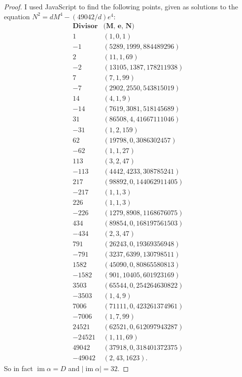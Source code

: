 \documentclass[12pt]{article}
\DeclareMathOperator{\im}{im}
\theoremstyle{definition}
\begin{document}
\begin{proof}
	I used JavaScript to find the following points, given as solutions to the equation $N^2 = dM^4 - (49042/d) e^4$: \begin{equation*}
		\begin{array}{r|c}
			\textbf{Divisor} & \textbf{(M, e, N)}       \\
			\hline
			1                & (1, 0, 1)                \\
			-1               & (5289, 1999, 884489296)  \\
			2                & (11, 1, 69)              \\
			-2               & (13105, 1387, 178211938) \\
			7                & (7, 1, 99)               \\
			-7               & (2902, 2550, 543815019)  \\
			14               & (4, 1, 9)                \\
			-14              & (7619, 3081, 518145689)  \\
			31               & (86508, 4, 41667111046)  \\
			-31              & (1, 2, 159)              \\
			62               & (19798, 0, 3086302457)   \\
			-62              & (1, 1, 27)               \\
			113              & (3, 2, 47)               \\
			-113             & (4442, 4233, 308785241)  \\
			217              & (98892, 0, 144062911405) \\
			-217             & (1, 1, 3)                \\
			226              & (1, 1, 3)                \\
			-226             & (1279, 8908, 1168676075) \\
			434              & (89854, 0, 168197561503) \\
			-434             & (2, 3, 47)               \\
			791              & (26243, 0, 19369356948)  \\
			-791             & (3237, 6399, 130798511)  \\
			1582             & (45090, 0, 80865580813)  \\
			-1582            & (901, 10405, 601923169)  \\
			3503             & (65544, 0, 254264630822) \\
			-3503            & (1, 4, 9)                \\
			7006             & (71111, 0, 423261374961) \\
			-7006            & (1, 7, 99)               \\
			24521            & (62521, 0, 612097943287) \\
			-24521           & (1, 11, 69)              \\
			49042            & (37918, 0, 318401372375) \\
			-49042           & (2, 43, 1623).
		\end{array}
	\end{equation*}
	So in fact $\im\alpha = D$ and $|\im\alpha| = 32$.


\end{proof}
\end{document}
